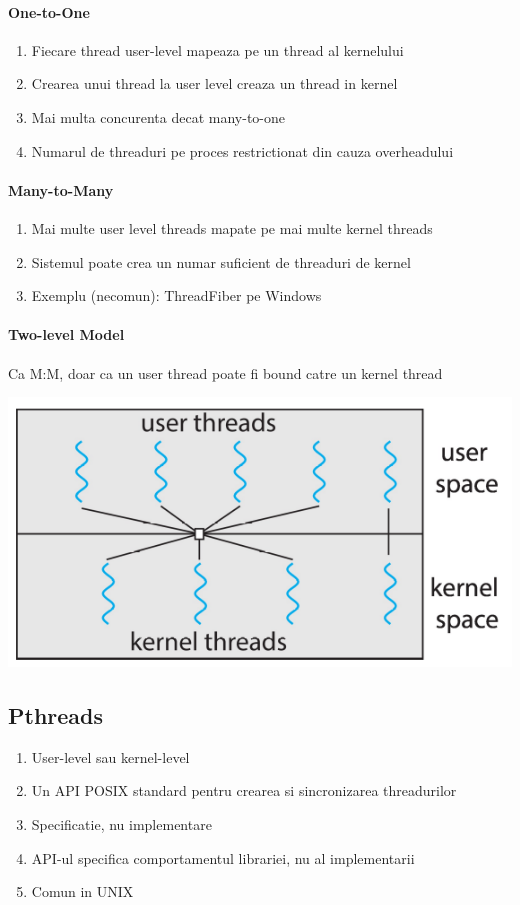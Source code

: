 \documentclass{article}
\begin{document}
\paragraph*{One-to-One}
\begin{enumerate}
    \item Fiecare thread user-level mapeaza pe un thread al kernelului
    \item Crearea unui thread la user level creaza un thread in kernel
    \item Mai multa concurenta decat many-to-one
    \item Numarul de threaduri pe proces restrictionat din cauza overheadului
\end{enumerate}
\paragraph*{Many-to-Many}
\begin{enumerate}
    \item Mai multe user level threads mapate pe mai multe kernel threads
    \item Sistemul poate crea un numar suficient de threaduri de kernel
    \item Exemplu (necomun): ThreadFiber pe Windows
\end{enumerate}
\paragraph*{Two-level Model} Ca M:M, doar ca un user thread poate fi bound catre un kernel thread

\begin{center}
    \includegraphics[scale=0.3]{8_twolevelmodel.png}
\end{center}

\subsection*{Pthreads}
\begin{enumerate}
    \item User-level sau kernel-level
    \item Un API POSIX standard pentru crearea si sincronizarea threadurilor
    \item Specificatie, nu implementare
    \item API-ul specifica comportamentul librariei, nu al implementarii
    \item Comun in UNIX 
\end{enumerate}
\end{document}
